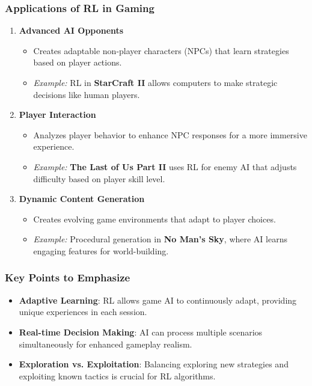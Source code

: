\documentclass{beamer}
\begin{document}
\begin{frame}
    \frametitle{Applications of RL in Gaming}
    \begin{enumerate}
        \item \textbf{Advanced AI Opponents}
            \begin{itemize}
                \item Creates adaptable non-player characters (NPCs) that learn strategies based on player actions.
                \item \textit{Example:} RL in \textbf{StarCraft II} allows computers to make strategic decisions like human players.
            \end{itemize}
        
        \item \textbf{Player Interaction}
            \begin{itemize}
                \item Analyzes player behavior to enhance NPC responses for a more immersive experience.
                \item \textit{Example:} \textbf{The Last of Us Part II} uses RL for enemy AI that adjusts difficulty based on player skill level.
            \end{itemize}

        \item \textbf{Dynamic Content Generation}
            \begin{itemize}
                \item Creates evolving game environments that adapt to player choices.
                \item \textit{Example:} Procedural generation in \textbf{No Man’s Sky}, where AI learns engaging features for world-building.
            \end{itemize}
    \end{enumerate}
\end{frame}

\begin{frame}[fragile]
    \frametitle{Key Points to Emphasize}
    \begin{itemize}
        \item \textbf{Adaptive Learning}: RL allows game AI to continuously adapt, providing unique experiences in each session.
        \item \textbf{Real-time Decision Making}: AI can process multiple scenarios simultaneously for enhanced gameplay realism.
        \item \textbf{Exploration vs. Exploitation}: Balancing exploring new strategies and exploiting known tactics is crucial for RL algorithms.
    \end{itemize}
\end{frame}
\end{document}
